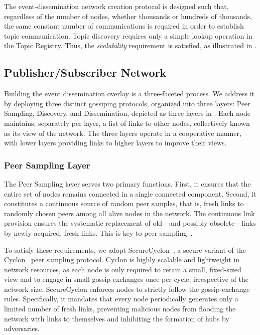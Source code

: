 The event-dissemination network creation protocol is designed such that, regardless of the number of nodes, whether thousands or hundreds of thousands,
the same constant number of communications is required in order to establish topic communication.
Topic discovery requires only a simple lookup operation in the Topic Registry.
Thus, the \emph{scalability} requirement is satisfied, as illustrated in .

\subsection{Publisher/Subscriber Network}
\label{subsec:publisher/subscriber-network}

Building the event dissemination overlay is a three-faceted process.
We address it by deploying three distinct gossiping protocols, organized into three layers: Peer Sampling, Discovery, and Dissemination, depicted as three layers in .
Each node maintains, separately per layer, a list of links to other nodes, collectively known as its view of the network.
The three layers operate in a cooperative manner, with lower layers providing links to higher layers to improve their views.

\subsubsection{Peer Sampling Layer}
\label{subsubsec:peer-sampling-layer}

The Peer Sampling layer serves two primary functions.
First, it ensures that the entire set of nodes remains connected in a single connected component.
Second, it constitutes a continuous source of random peer samples, that is, fresh links to randomly chosen peers among all alive nodes in the network.
The continuous link provision ensures the systematic replacement of old---and possibly obsolete---links by newly acquired, fresh links.
This is key to peer sampling~\cite{PeerSampling}.

To satisfy these requirements, we adopt SecureCyclon~\cite{SecureCyclon}, a secure variant of the Cyclon~\cite{Cyclon} peer sampling protocol.
Cyclon is highly scalable and lightweight in network resources, as each node is only required to retain a small, fixed-sized view and to engage in small gossip exchanges once per cycle, irrespective of the network size.
SecureCyclon enforces nodes to strictly follow the gossip-exchange rules.
Specifically, it mandates that every node periodically generates only a limited number of fresh links, preventing malicious nodes from flooding the network with links to themselves and inhibiting the formation of hubs by adversaries.

